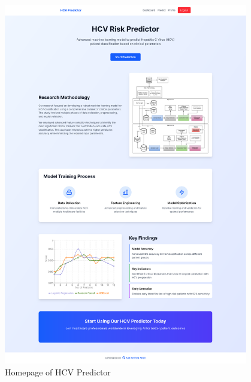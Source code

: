 \begin{figure}
  \begin{center}
    \includegraphics[width=0.95\textwidth]{figures/site/homepage.png}
  \end{center}
  \caption{Homepage of HCV Predictor}\label{fig:homepage}
\end{figure}


